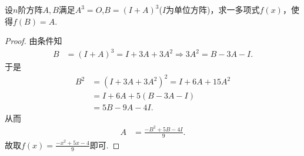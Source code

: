 \documentclass[../../main.tex]{subfiles}
\begin{document}
\begin{example}
设$n$阶方阵$A,B$满足$A^3 = O$,$B = (I + A)^3$($I$为单位方阵)，求一多项式$f(x)$，使得$f(B) = A$.
\end{example}
\begin{proof}
由条件知
\begin{align*}
B&=(I + A)^3 = I + 3A + 3A^2\Longrightarrow 3A^2 = B - 3A - I.
\end{align*}
于是
\begin{align*}
B^2&=(I + 3A + 3A^2)^2 = I + 6A + 15A^2\\
&=I + 6A + 5(B - 3A - I)\\
&=5B - 9A - 4I.
\end{align*}
从而
\begin{align*}
A&=\frac{-B^2 + 5B - 4I}{9}.
\end{align*}
故取$f(x) = \frac{-x^2 + 5x - 4}{9}$即可.

\end{proof}
\end{document}
